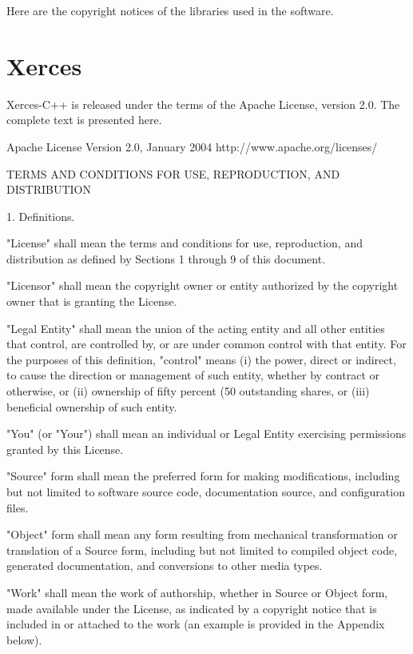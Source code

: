 \documentclass[twoside]{tceusermanual}
\begin{document}
Here are the copyright notices of the libraries used in the software.

\section{Xerces}

Xerces-C++ is released under the terms of the Apache License, version
2.0.  The complete text is presented here.


                                 Apache License
                           Version 2.0, January 2004
                        http://www.apache.org/licenses/

   TERMS AND CONDITIONS FOR USE, REPRODUCTION, AND DISTRIBUTION

   1. Definitions.

      "License" shall mean the terms and conditions for use, reproduction,
      and distribution as defined by Sections 1 through 9 of this document.

      "Licensor" shall mean the copyright owner or entity authorized by
      the copyright owner that is granting the License.

      "Legal Entity" shall mean the union of the acting entity and all
      other entities that control, are controlled by, or are under common
      control with that entity. For the purposes of this definition,
      "control" means (i) the power, direct or indirect, to cause the
      direction or management of such entity, whether by contract or
      otherwise, or (ii) ownership of fifty percent (50%
      outstanding shares, or (iii) beneficial ownership of such entity.

      "You" (or "Your") shall mean an individual or Legal Entity
      exercising permissions granted by this License.

      "Source" form shall mean the preferred form for making modifications,
      including but not limited to software source code, documentation
      source, and configuration files.

      "Object" form shall mean any form resulting from mechanical
      transformation or translation of a Source form, including but
      not limited to compiled object code, generated documentation,
      and conversions to other media types.

      "Work" shall mean the work of authorship, whether in Source or
      Object form, made available under the License, as indicated by a
      copyright notice that is included in or attached to the work
      (an example is provided in the Appendix below).
\end{document}
